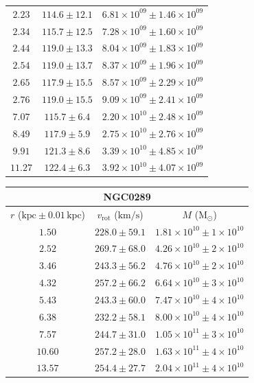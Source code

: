 \documentclass{article}
\newcommand\solmass{\textrm{M}_\odot}
\newcommand\kpc{\textrm{kpc}}
\newcommand\kmps{\textrm{km}/\textrm{s}}
\newcommand\vrot{\ensuremath{v_{\textrm{rot}}}}
\begin{document}
\begin{table}[h!]
\begin{tabular}{|c|c|c|}
        $2.23$ & $114.6 \pm 12.1$ & $6.81\times 10^{09} \pm 1.46\times 10^{09}$ \\
        $2.34$ & $115.7 \pm 12.5$ & $7.28\times 10^{09} \pm 1.60\times 10^{09}$ \\
        $2.44$ & $119.0 \pm 13.3$ & $8.04\times 10^{09} \pm 1.83\times 10^{09}$ \\
        $2.54$ & $119.0 \pm 13.7$ & $8.37\times 10^{09} \pm 1.96\times 10^{09}$ \\
        $2.65$ & $117.9 \pm 15.5$ & $8.57\times 10^{09} \pm 2.29\times 10^{09}$ \\
        $2.76$ & $119.0 \pm 15.5$ & $9.09\times 10^{09} \pm 2.41\times 10^{09}$ \\
        $7.07$ & $115.7 \pm 6.4$ & $2.20\times 10^{10} \pm 2.48\times 10^{09}$ \\
        $8.49$ & $117.9 \pm 5.9$ & $2.75\times 10^{10} \pm 2.76\times 10^{09}$ \\
        $9.91$ & $121.3 \pm 8.6$ & $3.39\times 10^{10} \pm 4.85\times 10^{09}$ \\
        $11.27$ & $122.4 \pm 6.3$ & $3.92\times 10^{10} \pm 4.07\times 10^{09}$ \\
        \hline
    \end{tabular}
    \hfill
    \begin{tabular}{|c|c|c|}
        \hline
        \multicolumn{3}{|c|}{NGC0289} \\
        \hline
        $r$ ($\kpc \pm 0.01 \,\kpc$) & $\vrot$ ($\kmps$) & $M$ ($\solmass$) \\
        \hline
        $1.50$ & $228.0 \pm 59.1$ & $1.81\times 10^{10} \pm 1\times 10^{10}$ \\
        $2.52$ & $269.7 \pm 68.0$ & $4.26\times 10^{10} \pm 2\times 10^{10}$ \\
        $3.46$ & $243.3 \pm 56.2$ & $4.76\times 10^{10} \pm 2\times 10^{10}$ \\
        $4.32$ & $257.2 \pm 66.2$ & $6.64\times 10^{10} \pm 3\times 10^{10}$ \\
        $5.43$ & $243.3 \pm 60.0$ & $7.47\times 10^{10} \pm 4\times 10^{10}$ \\
        $6.38$ & $232.2 \pm 58.1$ & $8.00\times 10^{10} \pm 4\times 10^{10}$ \\
        $7.57$ & $244.7 \pm 31.0$ & $1.05\times 10^{11} \pm 3\times 10^{10}$ \\
        $10.60$ & $257.2 \pm 28.0$ & $1.63\times 10^{11} \pm 4\times 10^{10}$ \\
        $13.57$ & $254.4 \pm 27.7$ & $2.04\times 10^{11} \pm 4\times 10^{10}$ \\

\end{tabular}
\end{table}
\end{document}
